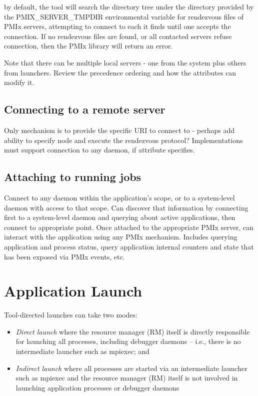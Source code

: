by default, the tool will search the directory tree under the directory provided by the PMIX_SERVER_TMPDIR environmental variable for rendezvous files of PMIx servers, attempting to connect to each it finds until one accepts the connection. If no rendezvous files are found, or all contacted servers refuse connection, then the PMIx library will return an error.

Note that there can be multiple local servers - one from the system plus others from launchers. Review the precedence ordering and how the attributes can modify it.


\subsection{Connecting to a remote server}

Only mechanism is to provide the specific URI to connect to - perhaps add ability to specify node and execute the rendezvous protocol? Implementations must support connection to any daemon, if attribute specifies.


\subsection{Attaching to running jobs}

Connect to any daemon within the application's scope, or to a system-level daemon with access to that scope. Can discover that information by connecting first to a system-level daemon and querying about active applications, then connect to appropriate point. Once attached to the appropriate PMIx server, can interact with the application using any PMIx mechanism. Includes querying application and process status, query application internal counters and state that has been exposed via PMIx events, etc.


\section{Application Launch}
\label{chap:api_tools:launch}

Tool-directed launches can take two modes:

\begin{itemize}
    \item \emph{Direct launch} where the resource manager (RM) itself is directly responsible for launching all processes, including debugger daemons – i.e., there is no intermediate launcher such as mpiexec; and
    \item \emph{Indirect launch} where all processes are started via an intermediate launcher such as mpiexec and the resource manager (RM) itself is not involved in launching application processes or debugger daemons
\end{itemize}


